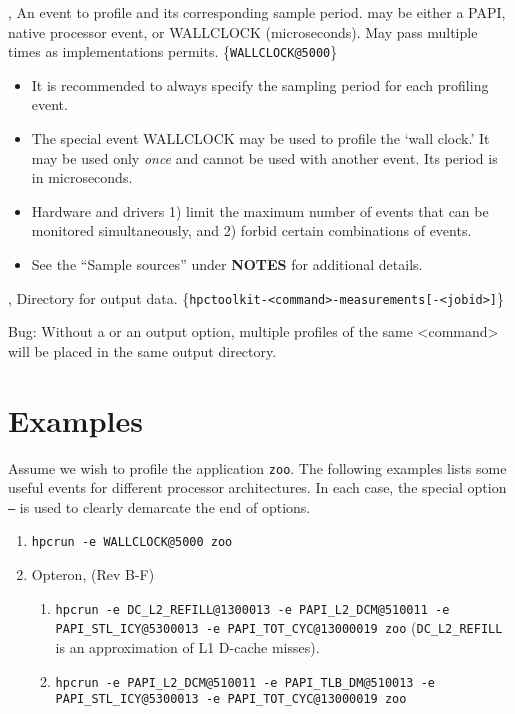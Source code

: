 \documentclass[english]{article}
\begin{document}
\begin{Description}
  \item[\OptArg{-e}{event\Lbr@period\Rbr}, \OptArg{--event}{event\Lbr@period\Rbr}] 
   An event to profile and its corresponding sample period.  may be either a PAPI, native processor event, or WALLCLOCK (microseconds).  May pass multiple times as implementations permits.  \{\verb+WALLCLOCK@5000+\}
  \begin{itemize}
    \item It is recommended to always specify the sampling period for each profiling event.
    \item The special event WALLCLOCK may be used to profile the `wall clock.'  It may be used only \emph{once} and cannot be used with another event. Its period is in microseconds.
    \item Hardware and drivers 1) limit the maximum number of events that can be monitored simultaneously, and 2) forbid certain combinations of events. 
    \item See the ``Sample sources'' under \textbf{NOTES} for additional details.
  \end{itemize}

  \item[\OptArg{-o}{outpath}, \OptArg{--output}{outpath}]
  Directory for output data.
  \{\verb+hpctoolkit-<command>-measurements[-<jobid>]+\}

  \begin{itemize}
  Bug: Without a  or an output option, multiple profiles of the same <command> will be placed in the same output directory.
  \end{itemize}

\end{Description}


\section{Examples}

Assume we wish to profile the application \texttt{zoo}.
The following examples lists some useful events for different processor architectures.
In each case, the special option \texttt{--} is used to clearly demarcate the end of  options.

\begin{enumerate}
\item \verb+hpcrun -e WALLCLOCK@5000 zoo+

\item Opteron, (Rev B-F)
  \begin{enumerate}
    \item \verb+hpcrun -e DC_L2_REFILL@1300013 -e PAPI_L2_DCM@510011 -e PAPI_STL_ICY@5300013 -e PAPI_TOT_CYC@13000019 zoo+ (\verb+DC_L2_REFILL+ is an approximation of L1 D-cache misses).
    \item \verb+hpcrun -e PAPI_L2_DCM@510011 -e PAPI_TLB_DM@510013 -e PAPI_STL_ICY@5300013 -e PAPI_TOT_CYC@13000019 zoo+
  \end{enumerate}

\end{enumerate}
\end{document}

